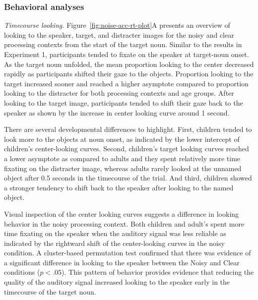 \documentclass[,man,floatsintext]{apa6}
\begin{document}
\hypertarget{behavioral-analyses-1}{%
\subsubsection{Behavioral analyses}\label{behavioral-analyses-1}}

\emph{Timecourse looking.} Figure~\ref{fig:noise-acc-rt-plot}A presents an overview of looking to the speaker, target, and distracter images for the noisy and clear processing contexts from the start of the target noun. Similar to the results in Experiment 1, participants tended to fixate on the speaker at target-noun onset. As the target noun unfolded, the mean proportion looking to the center decreased rapidly as participants shifted their gaze to the objects. Proportion looking to the target increased sooner and reached a higher asymptote compared to proportion looking to the distracter for both processing contexts and age groups. After looking to the target image, participants tended to shift their gaze back to the speaker as shown by the increase in center looking curve around 1 second.

There are several developmental differences to highlight. First, children tended to look more to the objects at noun onset, as indicated by the lower intercept of children's center-looking curves. Second, children's target looking curves reached a lower asymptote as compared to adults and they spent relatively more time fixating on the distracter image, whereas adults rarely looked at the unnamed object after 0.5 seconds in the timecourse of the trial. And third, children showed a stronger tendency to shift back to the speaker after looking to the named object.

Visual inspection of the center looking curves suggests a difference in looking behavior in the noisy processing context. Both children and adult's spent more time fixating on the speaker when the auditory signal was less reliable as indicated by the rightward shift of the center-looking curves in the noisy condition. A cluster-based permutation test confirmed that there was evidence of a significant difference in looking to the speaker between the Noisy and Clear conditions (\(p < .05\)). This pattern of behavior provides evidence that reducing the quality of the auditory signal increased looking to the speaker early in the timecourse of the target noun.
\end{document}
